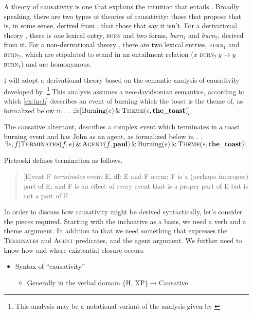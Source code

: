 \documentclass[letterpaper,12pt]{article}
\begin{document}
A theory of causativity is one that explains the intuition that \Last entails \LLast.
Broadly speaking, there are two types of theories of causativity: those that propose that \Last is, in some sense, derived from \LLast, that those that say it isn't.
For a derivational theory \parencite[e.g.][]{lakoff1976toward,hale1993argument,pietroski2003small}, there is one lexical entry, \textsc{burn} and two forms, \textit{burn}$_1$ and \textit{burn}$_2$, derived from it.
For a non-derivational theory \parencite[e.g.][]{fodor1970three}, there are two lexical entries, \textsc{burn}$_1$ and \textsc{burn$_2$}, which are stipulated to stand in an entailment relation ($x$ \textsc{burn}$_2\: y \rightarrow y$ \textsc{burn}$_1$) and are homonymous.

I will adopt a derivational theory based on the semantic analysis of causativity developed by \textcite{pietroski2003small}.\footnote{
  This analysis may be a notational variant of the analysis given by \textcite{kratzer_building_2004}
}
This analysis assumes a neo-davidsonian semantics, according to which \ref{ex:inch} describes an event of burning which the toast is the theme of, as formalized below in \Next.
\ex. $\exists e [\text{Burning}(e)\, \&\, \textsc{Theme}(e, \mathbf{the\_toast})]$

The causative alternant, describes a complex event which terminates in a toast burning event and has John as an agent, as formalized below in \Next.
\ex. $\exists e,f [ \textsc{Terminates}(f, e) \,\&\, \textsc{Agent}(f, \mathbf{paul}) \,\&\, \text{Burning}(e)\, \&\, \textsc{Theme}(e, \mathbf{the\_toast})]$

Pietroski defines termination as follows.
\begin{quote}
  [E]vent F \textit{terminates} event E, iff: E and F occur; F is a (perhaps improper) part of E; and F is an effect of every event that is a proper part of E but is not a part of F.\hfill\parencite[p190]{pietroski2003small}
\end{quote}

In order to discuss how causativity might be derived syntactically, let's consider the pieces required.
Starting with the inchoative as a basis, we need a verb and a theme argument.
In addition to that we need something that expresses the \textsc{Terminates} and \textsc{Agent} predicates, and the agent argument.
We further need to know how and where existential closure occurs.



\begin{itemize}
  \item Syntax of ``causativity''
    \begin{itemize}
      \item Generally in the verbal domain $\{\text{H, XP}\} \rightarrow $Causative
    \end{itemize}
\end{itemize}
\end{document}
